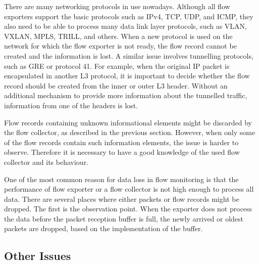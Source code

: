 There are many networking protocols in use nowadays. Although all flow exporters support the basic protocols such as IPv4, TCP, UDP, and ICMP, they also need to be able to process many data link layer protocols, such as VLAN, VXLAN, MPLS, TRILL, and others. When a new protocol is used on the network for which the flow exporter is not ready, the flow record cannot be created and the information is lost. A similar issue involves tunnelling protocols, such as GRE or protocol 41. For example, when the original IP packet is encapsulated in another L3 protocol, it is important to decide whether the flow record should be created from the inner or outer L3 header. Without an additional mechanism to provide more information about the tunnelled traffic, information from one of the headers is lost.

Flow records containing unknown informational elements might be discarded by the flow collector, as described in the previous section. However, when only some of the flow records contain such information elements, the issue is harder to observe. Therefore it is necessary to have a good knowledge of the used flow collector and its behaviour.

One of the most common reason for data loss in flow monitoring is that the performance of flow exporter or a flow collector is not high enough to process all data. There are several places where either packets or flow records might be dropped. The first is the observation point. When the exporter does not process the data before the packet reception buffer is full, the newly arrived or oldest packets are dropped, based on the implementation of the buffer. %
\label{chap:flow-monitoring-performance}




\subsection{Other Issues} %

%

